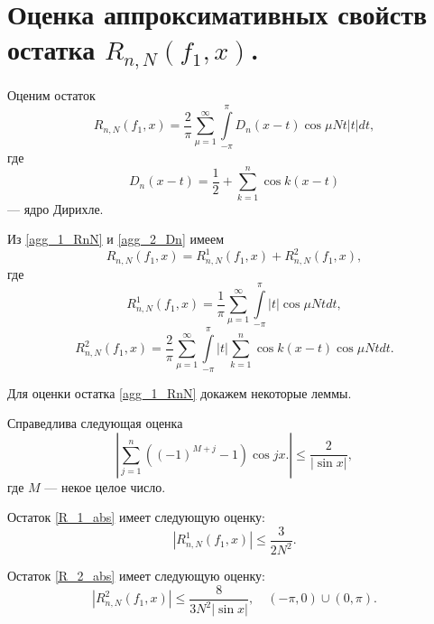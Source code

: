 \section{Оценка аппроксимативных свойств остатка $R_{n,N}(f_1,x)$.}
Оценим остаток
\begin{equation}
  R_{n,N}(f_1,x) = \frac{2}{\pi} \sum\limits_{\mu=1}^{\infty} \int\limits_{-\pi}^{\pi} D_n(x-t) \cos \mu N t |t| dt, \label{agg_1_RnN}
\end{equation}
где
\begin{equation}
  D_n(x-t) = \frac12 + \sum\limits_{k=1}^{n} \cos k (x - t) \label{agg_2_Dn}
\end{equation}
--- ядро Дирихле.

Из \eqref{agg_1_RnN} и \eqref{agg_2_Dn} имеем
\begin{equation}
  R_{n,N}(f_1,x) = R^1_{n,N}(f_1,x) + R^2_{n,N}(f_1,x),
\end{equation}
где
\begin{equation}
  R^1_{n,N}(f_1,x) = \frac{1}{\pi} \sum\limits_{\mu=1}^{\infty} \int\limits_{-\pi}^{\pi} |t| \cos \mu N t dt, \label{R_1_abs}
\end{equation}
\begin{equation}
  R^2_{n,N}(f_1,x) = \frac{2}{\pi} \sum\limits_{\mu=1}^{\infty} \int\limits_{-\pi}^{\pi} |t| \sum\limits_{k=1}^{n} \cos k (x-t) \cos \mu N t dt.
  \label{R_2_abs}
\end{equation}

Для оценки остатка \eqref{agg_1_RnN} докажем некоторые леммы.
\begin{lemma} \label{lemma sum cos}
  Справедлива следующая оценка
  \begin{equation}
    \left|\sum_{j=1}^{n} ((-1)^{M + j} - 1) \cos jx.\right| \leq \frac{2}{|\sin x|},
  \end{equation}
  где $M$ --- некое целое число.
\end{lemma}



\begin{lemma} \label{lm1}
  Остаток \eqref{R_1_abs} имеет следующую оценку:
  \begin{equation}
    |R^1_{n,N}(f_1,x)| \leq \frac{3}{2N^2}.
  \end{equation}
\end{lemma}

\begin{lemma} \label{lm2}
  Остаток \eqref{R_2_abs} имеет следующую оценку:
  \begin{equation}
    |R^2_{n,N}(f_1,x)| \leq \frac{8}{3 N^2|\sin x|}, \quad (-\pi, 0) \cup (0, \pi).
  \end{equation}
\end{lemma}


